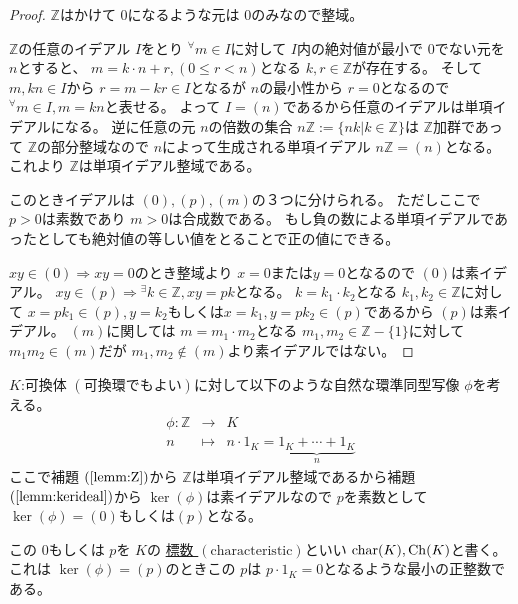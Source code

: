 \documentclass[../master_galois_theory]{subfiles}
\begin{document}
\begin{proof}
  $\mathbb{Z}$はかけて $0$になるような元は $0$のみなので整域。

  $\mathbb{Z}$の任意のイデアル $I$をとり ${}^\forall m \in I$に対して $I$内の絶対値が最小で $0$でない元を $n$とすると、 $m = k \cdot n + r , (0 \leq r < n)$となる $k , r \in \mathbb{Z}$が存在する。
  そして $m , kn \in I$から $r = m - kr \in I$となるが $n$の最小性から $r = 0$となるので ${}^\forall m \in I , m = kn$と表せる。
  よって $I = (n)$であるから任意のイデアルは単項イデアルになる。
  逆に任意の元 $n$の倍数の集合 $n \mathbb{Z} := \{ nk | k \in \mathbb{Z} \}$は $\mathbb{Z}$加群であって $\mathbb{Z}$の部分整域なので $n$によって生成される単項イデアル $n \mathbb{Z} = (n)$となる。
  これより $\mathbb{Z}$は単項イデアル整域である。

  このときイデアルは $(0) , (p) , (m)$の３つに分けられる。
  ただしここで $p > 0$は素数であり $m > 0$は合成数である。
  もし負の数による単項イデアルであったとしても絶対値の等しい値をとることで正の値にできる。

  $xy \in (0) \Rightarrow xy = 0$のとき整域より $x = 0 または y = 0$となるので $(0)$は素イデアル。
  $xy \in (p) \Rightarrow {}^\exists k \in \mathbb{Z} , xy = pk$となる。
  $k = k_1 \cdot k_2$となる $k_1 , k_2 \in \mathbb{Z}$に対して $x = pk_1 \in (p) , y = k_2 もしくは x = k_1 , y = pk_2 \in (p)$であるから $(p)$は素イデアル。
  $(m)$に関しては $m = m_1 \cdot m_2$となる $m_1 , m_2 \in \mathbb{Z} - \{ 1 \}$に対して
  $m_1 m_2 \in (m)$だが $m_1 , m_2 \notin (m)$より素イデアルではない。
\end{proof}

\begin{defi} \label{defi:hyousuu}
  $K$:可換体 $(可換環でもよい)$に対して以下のような自然な環準同型写像 $\phi$を考える。
  \begin{eqnarray*}
    \phi : \mathbb{Z} & \longrightarrow & K \\
    n & \longmapsto & n \cdot 1_K = \underbrace{1_K + \cdots + 1_K}_n
  \end{eqnarray*}
  ここで補題 $(\mathrm{\ref{lemm:Z}})$から $\mathbb{Z}$は単項イデアル整域であるから補題 $(\mathrm{\ref{lemm:kerideal}})$から $\ker(\phi)$は素イデアルなので
  $p$を素数として $\ker(\phi) = (0) もしくは (p)$となる。

  この $0$もしくは $p$を $K$の \underline{標数 $(\mathrm{characteristic})$}といい $\mathrm{char}(K) , \mathrm{Ch}(K)$と書く。
  これは $\ker(\phi) = (p)$のときこの $p$は $p \cdot 1_K = 0$となるような最小の正整数である。
\end{defi}
\end{document}

